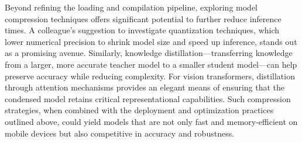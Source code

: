 \documentclass[12pt]{article}
\begin{document}
Beyond refining the loading and compilation pipeline, exploring model compression techniques offers significant potential to further reduce inference times. A colleague’s suggestion to investigate quantization techniques, which lower numerical precision to shrink model size and speed up inference, stands out as a promising avenue. Similarly, knowledge distillation—transferring knowledge from a larger, more accurate teacher model to a smaller student model—can help preserve accuracy while reducing complexity. For vision transformers, distillation through attention mechanisms provides an elegant means of ensuring that the condensed model retains critical representational capabilities. Such compression strategies, when combined with the deployment and optimization practices outlined above, could yield models that are not only fast and memory-efficient on mobile devices but also competitive in accuracy and robustness.

\newpage


\end{document}
